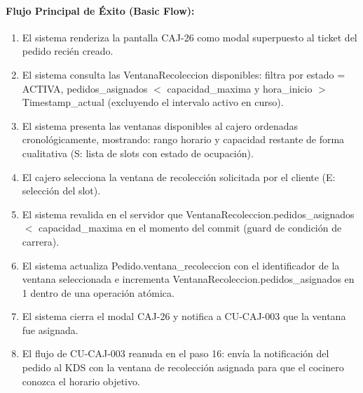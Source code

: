 \paragraph{Flujo Principal de Éxito (Basic Flow):}
\begin{enumerate}
    \item[I.] El sistema renderiza la pantalla CAJ-26 como modal superpuesto al ticket del pedido recién creado.
    \item[II.] El sistema consulta las VentanaRecoleccion disponibles: filtra por estado = ACTIVA, pedidos\_asignados $<$ capacidad\_maxima y hora\_inicio $>$ Timestamp\_actual (excluyendo el intervalo activo en curso).
    \item[III.] El sistema presenta las ventanas disponibles al cajero ordenadas cronológicamente, mostrando: rango horario y capacidad restante de forma cualitativa (S: lista de slots con estado de ocupación).
    \item[IV.] El cajero selecciona la ventana de recolección solicitada por el cliente (E: selección del slot).
    \item[V.] El sistema revalida en el servidor que VentanaRecoleccion.pedidos\_asignados $<$ capacidad\_maxima en el momento del commit (guard de condición de carrera).
    \item[VI.] El sistema actualiza Pedido.ventana\_recoleccion con el identificador de la ventana seleccionada e incrementa VentanaRecoleccion.pedidos\_asignados en 1 dentro de una operación atómica.
    \item[VII.] El sistema cierra el modal CAJ-26 y notifica a CU-CAJ-003 que la ventana fue asignada.
    \item[VIII.] El flujo de CU-CAJ-003 reanuda en el paso 16: envía la notificación del pedido al KDS con la ventana de recolección asignada para que el cocinero conozca el horario objetivo.
\end{enumerate}

